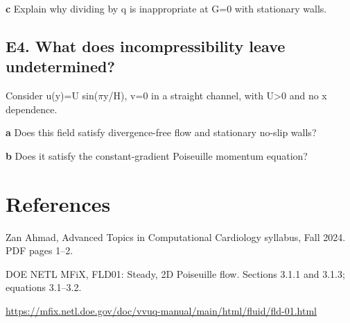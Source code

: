 \documentclass[11pt,letterpaper]{article}
\theoremstyle{definition}\newtheorem{definition}{Definition}\newtheorem{example}{Example}
\numberwithin{equation}{section}
\begin{document}
\textbf{c} Explain why dividing by q is inappropriate at G=\allowbreak{}0 with stationary walls.

\par\noindent\begin{minipage}{\linewidth}
\subsection*{E4. What does incompressibility leave undetermined?}
Consider u(y)=\allowbreak{}U sin($\pi$y/H), v=\allowbreak{}0 in a straight channel, with U>0 and no x dependence.

\textbf{a} Does this field satisfy divergence-free flow and stationary no-slip walls?

\end{minipage}\par\medskip
\textbf{b} Does it satisfy the constant-gradient Poiseuille momentum equation?

\section*{References}
\noindent\begin{minipage}{\linewidth}
Zan Ahmad, Advanced Topics in Computational Cardiology syllabus, Fall 2024. PDF pages 1--2.

\end{minipage}\par\medskip
\noindent\begin{minipage}{\linewidth}
DOE NETL MFiX, FLD01: Steady, 2D Poiseuille flow. Sections 3.1.1 and 3.1.3; equations 3.1--3.2.

\url{https://mfix.netl.doe.gov/doc/vvuq-manual/main/html/fluid/fld-01.html}
\end{minipage}\par\medskip
\end{document}
